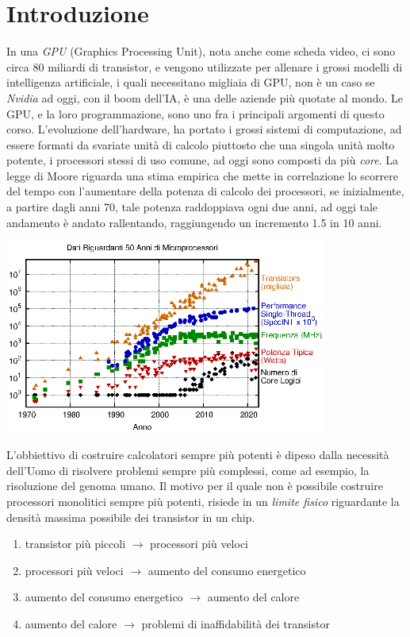 \documentclass[10pt, letterpaper]{report}
\begin{document}
\section{Introduzione}
In una \textit{GPU} (Graphics Processing Unit), nota anche come scheda video, ci sono circa 
80 miliardi di transistor, e vengono utilizzate per allenare i grossi modelli di intelligenza 
artificiale, i quali necessitano migliaia di GPU, non è un caso se \textit{Nvidia} ad oggi, con 
il boom dell'IA, è una delle aziende più quotate al mondo. Le GPU, e la loro 
programmazione, sono uno fra i principali argomenti di questo corso.\acc 
L'evoluzione dell'hardware, ha portato i grossi sistemi di computazione, ad essere formati da 
svariate unità di calcolo piuttosto che una singola unità molto potente, i processori stessi di uso comune, 
ad oggi sono composti da più \textit{core}.\acc 
La legge di Moore riguarda una stima empirica che mette in correlazione lo scorrere del tempo con 
l'aumentare della potenza di calcolo dei processori, se inizialmente, a partire dagli anni 70, tale potenza 
raddoppiava ogni due anni, ad oggi tale andamento è andato rallentando, raggiungendo un 
incremento 1.5 in 10 anni.
\begin{center}
    \includegraphics[width=300pt]{images/processor_trend.eps}
\end{center}
L'obbiettivo di costruire calcolatori sempre più potenti è dipeso dalla necessità dell'Uomo 
di risolvere problemi sempre più complessi, come ad esempio, la risoluzione del genoma umano.\acc 
Il motivo per il quale non è possibile costruire processori monolitici sempre più potenti, risiede 
in un \textit{limite fisico} riguardante la densità massima possibile dei transistor in 
un chip.\begin{enumerate}
    \item transistor più piccoli $\longrightarrow$ processori più veloci
    \item processori più veloci $\longrightarrow$ aumento del consumo energetico 
    \item aumento del consumo energetico $\longrightarrow$ aumento del calore 
    \item aumento del calore $\longrightarrow$ problemi di inaffidabilità dei transistor
\end{enumerate}
\flowerLine
\end{document}
